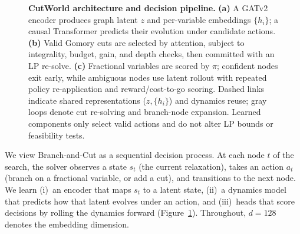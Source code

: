 \documentclass{article}
\begin{document}
\begin{figure}[t]
{\begin{tikzpicture}
\end{tikzpicture}
}
\caption{\textbf{CutWorld architecture and decision pipeline.}
\textbf{(a)} A GATv2 encoder produces graph latent $z$ and per-variable embeddings $\{h_i\}$; a causal Transformer predicts their evolution under candidate actions. 
\textbf{(b)} Valid Gomory cuts are selected by attention, subject to integrality, budget, gain, and depth checks, then committed with an LP re-solve. 
\textbf{(c)} Fractional variables are scored by $\pi$; confident nodes exit early, while ambiguous nodes use latent rollout with repeated policy re-application and reward/cost-to-go scoring. 
Dashed links indicate shared representations ($z,\{h_i\}$) and dynamics reuse; gray loops denote cut re-solving and branch-node expansion. Learned components only select valid actions and do not alter LP bounds or feasibility tests.}
\label{fig:arch}
\end{figure}

We view Branch-and-Cut as a sequential decision process. At each node $t$ of the search, the solver observes a state $s_t$ (the current relaxation), takes an action $a_t$ (branch on a fractional variable, or add a cut), and transitions to the next node. We learn (i)~an encoder that maps $s_t$ to a latent state, (ii)~a dynamics model that predicts how that latent evolves under an action, and (iii)~heads that score decisions by rolling the dynamics forward (Figure~\ref{fig:arch}). Throughout, $d=128$ denotes the embedding dimension.


\end{document}
